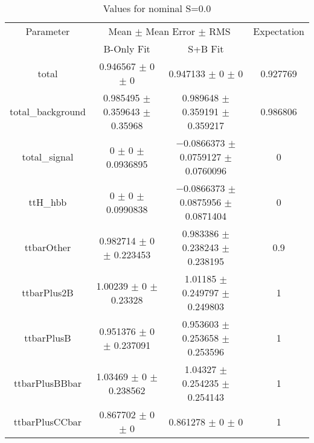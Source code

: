 \begin{table}
\centering
\caption{Values for nominal S=0.0}
\begin{tabular}{cccc}
\toprule
Parameter & \multicolumn{2}{c}{Mean $\pm$ Mean Error $\pm$ RMS} & Expectation\\
 & B-Only Fit & S+B Fit & \\
\midrule
total & \num{0.946567} $\pm$ \num{0} $\pm$ \num{0} & \num{0.947133} $\pm$ \num{0} $\pm$ \num{0} & \num{0.927769}\\
total\_background & \num{0.985495} $\pm$ \num{0.359643} $\pm$ \num{0.35968} & \num{0.989648} $\pm$ \num{0.359191} $\pm$ \num{0.359217} & \num{0.986806}\\
total\_signal & \num{0} $\pm$ \num{0} $\pm$ \num{0.0936895} & \num{-0.0866373} $\pm$ \num{0.0759127} $\pm$ \num{0.0760096} & \num{0}\\
ttH\_hbb & \num{0} $\pm$ \num{0} $\pm$ \num{0.0990838} & \num{-0.0866373} $\pm$ \num{0.0875956} $\pm$ \num{0.0871404} & \num{0}\\
ttbarOther & \num{0.982714} $\pm$ \num{0} $\pm$ \num{0.223453} & \num{0.983386} $\pm$ \num{0.238243} $\pm$ \num{0.238195} & \num{0.9}\\
ttbarPlus2B & \num{1.00239} $\pm$ \num{0} $\pm$ \num{0.23328} & \num{1.01185} $\pm$ \num{0.249797} $\pm$ \num{0.249803} & \num{1}\\
ttbarPlusB & \num{0.951376} $\pm$ \num{0} $\pm$ \num{0.237091} & \num{0.953603} $\pm$ \num{0.253658} $\pm$ \num{0.253596} & \num{1}\\
ttbarPlusBBbar & \num{1.03469} $\pm$ \num{0} $\pm$ \num{0.238562} & \num{1.04327} $\pm$ \num{0.254235} $\pm$ \num{0.254143} & \num{1}\\
ttbarPlusCCbar & \num{0.867702} $\pm$ \num{0} $\pm$ \num{0} & \num{0.861278} $\pm$ \num{0} $\pm$ \num{0} & \num{1}\\
\bottomrule
\end{tabular}
\end{table}